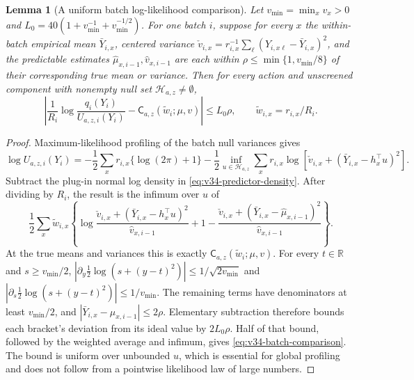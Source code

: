 \documentclass{article}
\theoremstyle{plain}
\newtheorem{lemma}[theorem]{Lemma}
\theoremstyle{definition}
\begin{document}
\begin{lemma}[A uniform batch log-likelihood comparison]
\label{lem:v34-batch-comparison}
Let $v_{\min}=\min_xv_x>0$ and
$L_0=40(1+v_{\min}^{-1}+v_{\min}^{-1/2})$.
For one batch $i$, suppose for every $x$ the within-batch empirical mean
$\bar Y_{i,x}$, centered variance
$\check v_{i,x}=r_{i,x}^{-1}\sum_\ell(Y_{i,x\ell}-\bar Y_{i,x})^2$,
and the predictable estimates $\widehat\mu_{x,i-1},\widehat v_{x,i-1}$
are each within $\rho\le\min\{1,v_{\min}/8\}$ of their corresponding
true mean or variance. Then for every action and unscreened component
with nonempty null set $\mathcal H_{a,z}\ne\emptyset$,
\begin{equation}
 \left|\frac1{R_i}\log\frac{q_i(Y_i)}{U_{a,z,i}(Y_i)}-
 \mathsf C_{a,z}(\widetilde w_i;\mu,v)\right|
 \le L_0\rho,
 \qquad \widetilde w_{i,x}=r_{i,x}/R_i.
 \label{eq:v34-batch-comparison}
\end{equation}
\end{lemma}
\begin{proof}
Maximum-likelihood profiling of the batch null variances gives
\[
 \log U_{a,z,i}(Y_i)
 =-\frac12\sum_xr_{i,x}\{\log(2\pi)+1\}
  -\frac12\inf_{u\in\mathcal H_{a,z}}
       \sum_xr_{i,x}\log[\check v_{i,x}+
                              (\bar Y_{i,x}-h_x^\top u)^2].
\]
Subtract the plug-in normal log density in
\eqref{eq:v34-predictor-density}. After dividing by $R_i$, the
result is the infimum over $u$ of
\[
 \frac12\sum_x\widetilde w_{i,x}
 \left\{\log\frac{\check v_{i,x}+(\bar Y_{i,x}-h_x^\top u)^2}
                     {\widehat v_{x,i-1}}+1-
 \frac{\check v_{i,x}+
                (\bar Y_{i,x}-\widehat\mu_{x,i-1})^2}
      {\widehat v_{x,i-1}}\right\}.
\]
At the true means and variances this is exactly
$\mathsf C_{a,z}(\widetilde w_i;\mu,v)$.
For every $t\in\mathbb R$ and $s\ge v_{\min}/2$,
$|\partial_y\frac12\log(s+(y-t)^2)|\le
1/\sqrt{2v_{\min}}$ and
$|\partial_s\frac12\log(s+(y-t)^2)|\le1/v_{\min}$.
The remaining terms have denominators at least $v_{\min}/2$,
and $|\bar Y_{i,x}-\widehat\mu_{x,i-1}|\le2\rho$.
Elementary subtraction therefore bounds each bracket's deviation from
its ideal value by $2L_0\rho$. Half of that bound, followed by the
weighted average and infimum, gives \eqref{eq:v34-batch-comparison}.
The bound is uniform over unbounded $u$, which is essential for global
profiling and does not follow from a pointwise likelihood law of large
numbers.
\end{proof}
\end{document}
